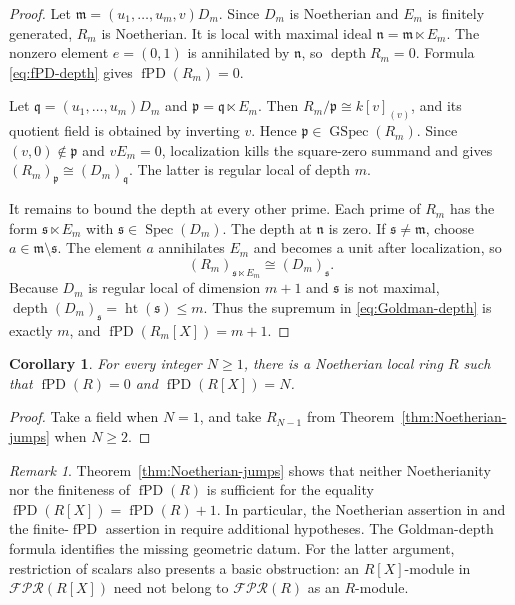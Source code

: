 \documentclass[11pt]{amsart}
\numberwithin{equation}{section}
\newtheorem{corollary}[theorem]{Corollary}
\theoremstyle{definition}
\theoremstyle{remark}
\newtheorem{remark}[theorem]{Remark}
\newcommand{\fPD}{\operatorname{fPD}}
\newcommand{\Spec}{\operatorname{Spec}}
\newcommand{\GSpec}{\operatorname{GSpec}}
\newcommand{\depth}{\operatorname{depth}}
\newcommand{\htp}{\operatorname{ht}}
\newcommand{\FPR}{\mathcal{FPR}}
\begin{document}
\begin{proof}
Let $\mathfrak m=(u_1,\ldots,u_m,v)D_m$.  Since $D_m$ is Noetherian and $E_m$ is finitely generated, $R_m$ is Noetherian.  It is local with maximal ideal $\mathfrak n=\mathfrak m\ltimes E_m$.  The nonzero element $e=(0,1)$ is annihilated by $\mathfrak n$, so $\depth R_m=0$.  Formula \eqref{eq:fPD-depth} gives $\fPD(R_m)=0$.

Let $\mathfrak q=(u_1,\ldots,u_m)D_m$ and $\mathfrak p=\mathfrak q\ltimes E_m$.  Then $R_m/\mathfrak p\cong k[v]_{(v)}$, and its quotient field is obtained by inverting $v$.  Hence $\mathfrak p\in\GSpec(R_m)$.  Since $(v,0)\notin\mathfrak p$ and $vE_m=0$, localization kills the square-zero summand and gives $(R_m)_{\mathfrak p}\cong(D_m)_{\mathfrak q}$.  The latter is regular local of depth $m$.

It remains to bound the depth at every other prime.  Each prime of $R_m$ has the form $\mathfrak s\ltimes E_m$ with $\mathfrak s\in\Spec(D_m)$.  The depth at $\mathfrak n$ is zero.  If $\mathfrak s\neq\mathfrak m$, choose $a\in\mathfrak m\setminus\mathfrak s$.  The element $a$ annihilates $E_m$ and becomes a unit after localization, so
\[
 (R_m)_{\mathfrak s\ltimes E_m}\cong(D_m)_{\mathfrak s}.
\]
Because $D_m$ is regular local of dimension $m+1$ and $\mathfrak s$ is not maximal, $\depth(D_m)_{\mathfrak s}=\htp(\mathfrak s)\leq m$.  Thus the supremum in \eqref{eq:Goldman-depth} is exactly $m$, and $\fPD(R_m[X])=m+1$.
\end{proof}

\begin{corollary}\label{cor:all-polynomial-values}
For every integer $N\geq1$, there is a Noetherian local ring $R$ such that $\fPD(R)=0$ and $\fPD(R[X])=N$.
\end{corollary}

\begin{proof}
Take a field when $N=1$, and take $R_{N-1}$ from Theorem~\ref{thm:Noetherian-jumps} when $N\geq2$.
\end{proof}

\begin{remark}\label{rem:scope-of-plus-one}
Theorem~\ref{thm:Noetherian-jumps} shows that neither Noetherianity nor the finiteness of $\fPD(R)$ is sufficient for the equality $\fPD(R[X])=\fPD(R)+1$.  In particular, the Noetherian assertion in \cite[Theorem~4.4]{ZhangII} and the finite-$\fPD$ assertion in \cite[Theorem~3.4]{XiongEtAl} require additional hypotheses.  The Goldman-depth formula identifies the missing geometric datum.  For the latter argument, restriction of scalars also presents a basic obstruction: an $R[X]$-module in $\FPR(R[X])$ need not belong to $\FPR(R)$ as an $R$-module.
\end{remark}
\end{document}
